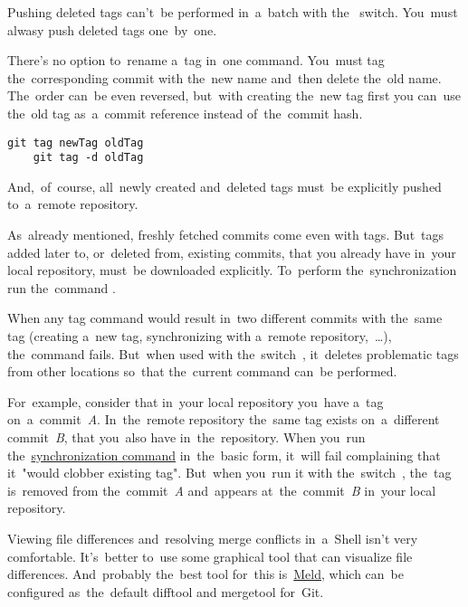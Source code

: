 \note Pushing deleted tags can't~be performed in~a~batch with the~ switch.
You~must alwasy push deleted tags one~by~one.

There's no option to~rename a~tag in~one command.
You~must tag the~corresponding commit with the~new name and~then delete the~old name.
The~order can~be even reversed, but~with creating the~new tag first you can~use the~old tag as~a~commit reference instead of~the~commit hash.

\begin{lstlisting}[frame=no]
    git tag newTag oldTag
    git tag -d oldTag
\end{lstlisting}

\noindent And,~of~course, all~newly created and~deleted tags must~be explicitly pushed to~a~remote repository.

\label{gittagsynchronization}
As~already mentioned, freshly fetched commits come even with tags.
But~tags added later to, or~deleted from, existing commits, that you already have in~your local repository, must~be downloaded explicitly.
To~perform the~synchronization run the~command .

When any tag command would result in~two different commits with the~same tag (creating a~new tag, synchronizing with a~remote repository,~\dots), the~command fails.
But~when used with the~switch~, it~deletes problematic tags from other locations so~that the~current command can~be performed.

For~example, consider that in~your local repository you~have a~tag on~a~commit~\textit{A}.
In~the~remote repository the~same tag exists on~a~different commit~\textit{B}, that you~also have in~the~repository.
When you~run the~\hyperref[gittagsynchronization]{synchronization command} in~the~basic form, it~will fail complaining that it~"would clobber existing tag".
But~when you~run it with the~switch~, the~tag is~removed from the~commit~\textit{A} and~appears at~the~commit~\textit{B} in~your local repository.

Viewing file differences and~resolving merge conflicts in~a~Shell isn't very comfortable.
It's~better to~use some graphical tool that can visualize file differences.
And~probably the~best tool for~this is~\href{https://meldmerge.org/}{Meld}, which can~be configured as~the~default difftool and mergetool for~Git.


